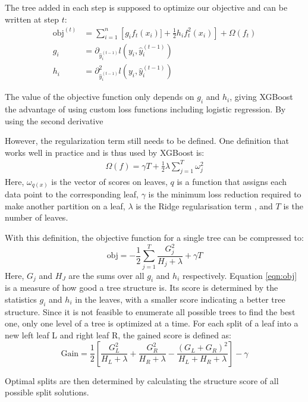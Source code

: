 The tree added in each step is supposed to optimize our objective and can be written at step $t$:
\begin{align}
  \text{obj}^{(t)} &= \sum_{i=1}^n \left[g_i f_t(x_i)] + \frac{1}{2}h_i f_t^2(x_i)\right] + \Omega(f_t)  \\
  g_i &= \partial_{\hat{y}_i^{(t-1)}} l(y_i, \hat{y}_i^{(t-1)}) \\
  h_i &= \partial^2_{\hat{y}_i^{(t-1)}} l(y_i, \hat{y}_i^{(t-1)})
\end{align}

The value of the objective function only depends on $g_i$ and $h_i$, giving XGBoost the advantage of using custom loss functions including logistic regression. By using the
second derivative

However, the regularization term still needs to be defined. One definition that works well in practice and is thus used by XGBoost is:
\begin{align}
  \Omega (f) = \gamma T + \frac{1}{2}\lambda \sum_{j=1}^T \omega_j^2
\end{align}
Here, $\omega_{q(x)}$ is the vector of scores on leaves, $q$ is a function that assigns each data point to the corresponding leaf, $\gamma$ is the minimum loss reduction required to make
another partition on a leaf, $\lambda$ is the Ridge regularisation term \cite{ridge},
and $T$ is the number of leaves.

With this definition, the objective function for a single tree can be compressed to:
\begin{equation} \label{eqn:obj}
  \text{obj} = -\frac{1}{2}\sum_{j=1}^T \frac{G_j^2}{H_j + \lambda} + \gamma T
\end{equation}
Here, $G_j$ and $H_J$ are the sums over all $g_i$ and $h_i$ respectively. Equation \ref{eqn:obj} is a measure of how good a tree structure is. Its score
is determined by the statistics $g_i$ and $h_i$ in the leaves, with a smaller score indicating a better tree structure.
Since it is not feasible to enumerate all possible trees to find the best one, only one level of a tree is optimized at a time.
For each split of a leaf into a new left leaf L and right leaf R, the gained score is defined as:
\begin{equation}
  \text{Gain} = \frac{1}{2}\left[\frac{G_L^2}{H_L + \lambda} + \frac{G_R^2}{H_R + \lambda} - \frac{(G_L + G_R)^2}{H_L+H_R+\lambda}\right] -\gamma
\end{equation}

Optimal splits are then determined by calculating the structure score of all possible split solutions.

